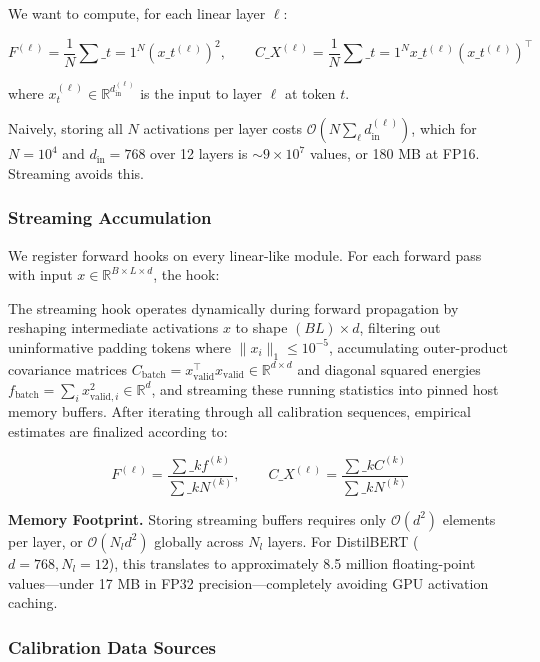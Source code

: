We want to compute, for each linear layer $\ell$:

\[
F^{(\ell)} = \frac{1}{N} \sum\_{t=1}^{N} \left(x\_t^{(\ell)}\right)^2, \qquad
C\_X^{(\ell)} = \frac{1}{N} \sum\_{t=1}^{N} x\_t^{(\ell)} \left(x\_t^{(\ell)}\right)^\top
\tag{4.1}
\]

where $x_t^{(\ell)} \in \mathbb{R}^{d_\text{in}^{(\ell)}}$ is the input to 
layer $\ell$ at token $t$.

Naively, storing all $N$ activations per layer costs $\mathcal{O}(N \sum_\ell d_\text{in}^{(\ell)})$, 
which for $N = 10^4$ and $d_\text{in} = 768$ over 12 layers is $\sim 9 \times 10^7$ 
values, or 180 MB at FP16. Streaming avoids this.

\subsubsection{Streaming Accumulation}

We register forward hooks on every linear-like module. For each forward pass 
with input $x \in \mathbb{R}^{B \times L \times d}$, the hook:

The streaming hook operates dynamically during forward propagation by reshaping intermediate activations $x$ to shape $(B L) \times d$, filtering out uninformative padding tokens where $\|x_i\|_1 \le 10^{-5}$, accumulating outer-product covariance matrices $C_\text{batch} = x_\text{valid}^\top x_\text{valid} \in \mathbb{R}^{d \times d}$ and diagonal squared energies $f_\text{batch} = \sum_i x_{\text{valid}, i}^2 \in \mathbb{R}^d$, and streaming these running statistics into pinned host memory buffers. After iterating through all calibration sequences, empirical estimates are finalized according to:

\[
F^{(\ell)} = \frac{\sum\_k f^{(k)}}{\sum\_k N^{(k)}}, \qquad
C\_X^{(\ell)} = \frac{\sum\_k C^{(k)}}{\sum\_k N^{(k)}}
\tag{4.2}
\]

\textbf{Memory Footprint.} Storing streaming buffers requires only $\mathcal{O}(d^2)$ elements per layer, or $\mathcal{O}(N_l d^2)$ globally across $N_l$ layers. For DistilBERT ($d = 768, N_l = 12$), this translates to approximately 8.5 million floating-point values—under 17 MB in FP32 precision—completely avoiding GPU activation caching.

\subsubsection{Calibration Data Sources}

